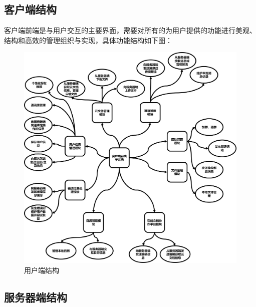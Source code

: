     \subsection{客户端结构}
        客户端前端是与用户交互的主要界面，需要对所有的为用户提供的功能进行美观、
        结构和高效的管理组织与实现，具体功能结构如下图：
        \newpage
        \begin{figure}[h]
            \centering
            \includegraphics[scale=0.25]{OutlineDesign/figures/用户端结构.png}
            \caption{用户端结构}
            \label{fig:server_flow}
        \end{figure}
    \subsection{服务器端结构}
    
